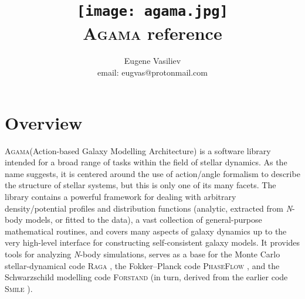 \documentclass[12pt]{article}
\newcommand{\Agama}{\textsc{Agama}\xspace}
\newcommand{\Nbody}{\textsl{N}-body\xspace}
\begin{document}
\title{\vspace*{-12mm}
\texttt{[image: agama.jpg]}\protect\\[3mm]\Agama reference\protect\\[-4mm]}
\author{Eugene Vasiliev\\
\normalsize\textrm{email: eugvas@protonmail.com} }

\maketitle
\vspace*{-15mm}
\tableofcontents
\newpage

\section{Overview}

\Agama (Action-based Galaxy Modelling Architecture) is a software library intended for a broad range of tasks within the field of stellar dynamics. As the name suggests, it is centered around the use of action/angle formalism to describe the structure of stellar systems, but this is only one of its many facets. The library contains a powerful framework for dealing with arbitrary density/potential profiles and distribution functions (analytic, extracted from \Nbody models, or fitted to the data), a vast collection of general-purpose mathematical routines, and covers many aspects of galaxy dynamics up to the very high-level interface for constructing self-consistent galaxy models. It provides tools for analyzing \Nbody simulations, serves as a base for the Monte Carlo stellar-dynamical code \textsc{Raga} \cite{Vasiliev2015}, the Fokker--Planck code \textsc{PhaseFlow} \cite{Vasiliev2017}, and the Schwarzschild modelling code \textsc{Forstand} \cite{VasilievValluri2020} (in turn, derived from the earlier code \textsc{Smile} \cite{Vasiliev2013,VasilievAthanassoula2015}).
\end{document}
